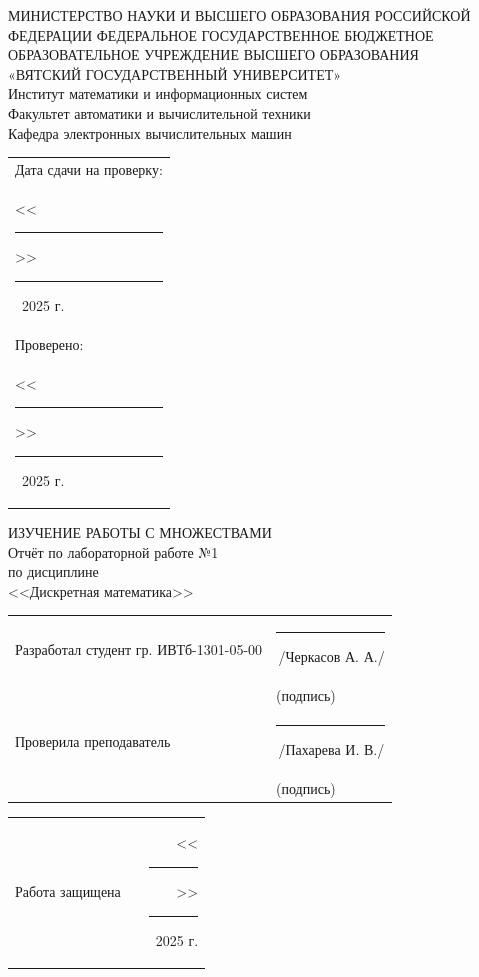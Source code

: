 \documentclass[oneside,a4paper,14pt]{extarticle}
\begin{document}
\newpage
\thispagestyle{empty}
\begin{center}
	МИНИСТЕРСТВО НАУКИ И ВЫСШЕГО ОБРАЗОВАНИЯ РОССИЙСКОЙ ФЕДЕРАЦИИ ФЕДЕРАЛЬНОЕ ГОСУДАРСТВЕННОЕ БЮДЖЕТНОЕ ОБРАЗОВАТЕЛЬНОЕ УЧРЕЖДЕНИЕ ВЫСШЕГО ОБРАЗОВАНИЯ\\
	«ВЯТСКИЙ ГОСУДАРСТВЕННЫЙ УНИВЕРСИТЕТ»\\
	Институт математики и информационных систем\\
	Факультет автоматики и вычислительной техники\\
	Кафедра электронных вычислительных машин
\end{center}
\vspace{10mm}

\hfill
\begin{tabular}{l}
  \footnotesize Дата сдачи на проверку: \\
  \footnotesize <<\rule[-1mm]{5mm}{0.10mm}\/>>\rule[-1mm]{20mm}{0.10mm}\ 2025 г.\\
  \footnotesize Проверено: \\
  \footnotesize <<\rule[-1mm]{5mm}{0.10mm}\/>>\rule[-1mm]{20mm}{0.10mm}\ 2025 г. \\
\end{tabular}
\vfill

\begin{center}
    ИЗУЧЕНИЕ РАБОТЫ С МНОЖЕСТВАМИ\\
	Отчёт по лабораторной работе №1\\
	по дисциплине\\
	<<Дискретная математика>>\\
\end{center}
\vspace{25mm}
\noindent
\begin{tabular}{ll}
	Разработал студент гр. ИВТб-1301-05-00 & \rule[-1mm]{30mm}{0.10mm}\,/Черкасов А. А./   \\
	                                       & \hspace{8mm}\footnotesize(подпись)            \\
	Проверила преподаватель                & \rule[-1mm]{30mm}{0.10mm}\,/Пахарева И. В./ \\
	                                       & \hspace{8mm}\footnotesize(подпись)            \\
\end{tabular}

\noindent
  \begin{tabular}{lp{58mm}r}
    Работа защищена &  & <<\rule[-1mm]{5mm}{0.10mm}\/>>\rule[-1mm]{30mm}{0.10mm}\ 2025 г.
  \end{tabular}
  \vfill
\end{document}
